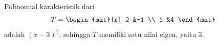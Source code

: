 \begin{example}   \label{ex:SingJordBlock}
Polinomial karakteristik dari
\begin{equation*}
  T=\begin{mat}[r]
      2  &-1  \\
      1  &4
    \end{mat}
\end{equation*}
adalah \( (x-3)^2 \), sehingga \( T \) memiliki satu nilai eigen, yaitu \( 3 \).


\end{example}
